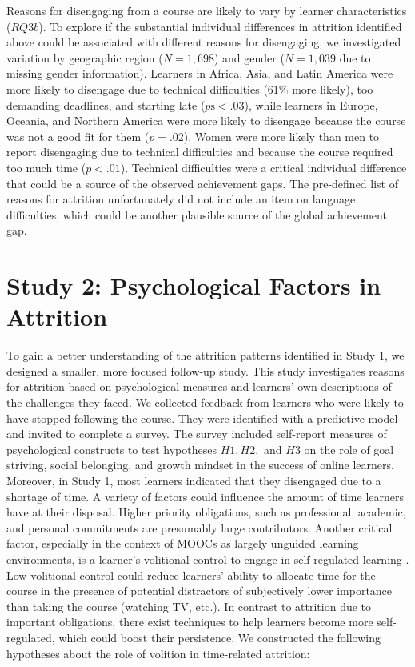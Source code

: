 \documentclass{sigchi}\usepackage[]{graphicx}\usepackage[]{color}
\begin{document}
Reasons for disengaging from a course are likely to vary by learner characteristics ($RQ3b$). To explore if the substantial individual differences in attrition identified above could be associated with different reasons for disengaging, we investigated variation by geographic region ($N = 1,698$) and gender ($N = 1,039$ due to missing gender information). Learners in Africa, Asia, and Latin America were more likely to disengage due to technical difficulties (61\% more likely), too demanding deadlines, and starting late ($p\text{s} < .03$), while learners in Europe, Oceania, and Northern America were more likely to disengage because the course was not a good fit for them ($p=.02$). Women were more likely than men to report disengaging due to technical difficulties and because the course required too much time ($p<.01$). Technical difficulties were a critical individual difference that could be a source of the observed achievement gaps. The pre-defined list of reasons for attrition unfortunately did not include an item on language difficulties, which could be another plausible source of the global achievement gap.


\section{Study 2: Psychological Factors in Attrition}

To gain a better understanding of the attrition patterns identified in Study 1, we designed a smaller, more focused follow-up study. This study investigates reasons for attrition based on psychological measures and learners' own descriptions of the challenges they faced. We collected feedback from learners who were likely to have stopped following the course. They were identified with a predictive model and invited to complete a survey. The survey included self-report measures of psychological constructs to test hypotheses $H1, H2,$ and $H3$ on the role of goal striving, social belonging, and growth mindset in the success of online learners. Moreover, in Study 1, most learners indicated that they disengaged due to a shortage of time. A variety of factors could influence the amount of time learners have at their disposal. Higher priority obligations, such as professional, academic, and personal commitments are presumably large contributors. Another critical factor, especially in the context of MOOCs as largely unguided learning environments, is a learner's volitional control to engage in self-regulated learning \cite{corno2001volitional}. Low volitional control could reduce learners' ability to allocate time for the course in the presence of potential distractors of subjectively lower importance than taking the course (watching TV, etc.). In contrast to attrition due to important obligations, there exist techniques to help learners become more self-regulated, which could boost their persistence. We constructed the following hypotheses about the role of volition in time-related attrition:
\end{document}
